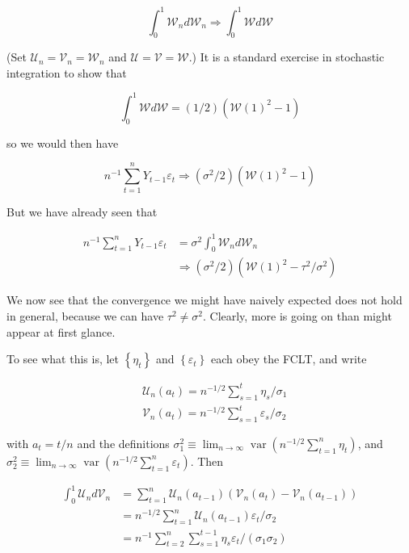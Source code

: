 \documentclass[10pt]{article}
\begin{document}
$$
\int_{0}^{1} \mathcal{W}_{n} d \mathcal{W}_{n} \Rightarrow \int_{0}^{1} \mathcal{W} d \mathcal{W}
$$

(Set $\mathcal{U}_{n}=\mathcal{V}_{n}=\mathcal{W}_{n}$ and $\mathcal{U}=\mathcal{V}=\mathcal{W}$.) It is a standard exercise in stochastic integration to show that

$$
\int_{0}^{1} \mathcal{W} d \mathcal{W}=(1 / 2)\left(\mathcal{W}(1)^{2}-1\right)
$$

so we would then have

$$
n^{-1} \sum_{t=1}^{n} Y_{t-1} \varepsilon_{t} \Rightarrow\left(\sigma^{2} / 2\right)\left(\mathcal{W}(1)^{2}-1\right)
$$

But we have already seen that

$$
\begin{aligned}
n^{-1} \sum_{t=1}^{n} Y_{t-1} \varepsilon_{t} & =\sigma^{2} \int_{0}^{1} \mathcal{W}_{n} d \mathcal{W}_{n} \\
& \Rightarrow\left(\sigma^{2} / 2\right)\left(\mathcal{W}(1)^{2}-\tau^{2} / \sigma^{2}\right)
\end{aligned}
$$

We now see that the convergence we might have naively expected does not hold in general, because we can have $\tau^{2} \neq \sigma^{2}$. Clearly, more is going on than might appear at first glance.

To see what this is, let $\left\{\eta_{t}\right\}$ and $\left\{\varepsilon_{t}\right\}$ each obey the FCLT, and write

$$
\begin{aligned}
& \mathcal{U}_{n}\left(a_{t}\right)=n^{-1 / 2} \sum_{s=1}^{t} \eta_{s} / \sigma_{1} \\
& \mathcal{V}_{n}\left(a_{t}\right)=n^{-1 / 2} \sum_{s=1}^{t} \varepsilon_{s} / \sigma_{2}
\end{aligned}
$$

with $a_{t}=t / n$ and the definitions $\sigma_{1}^{2} \equiv \lim _{n \rightarrow \infty} \operatorname{var}\left(n^{-1 / 2} \sum_{t=1}^{n} \eta_{t}\right)$, and $\sigma_{2}^{2} \equiv \lim _{n \rightarrow \infty} \operatorname{var}\left(n^{-1 / 2} \sum_{t=1}^{n} \varepsilon_{t}\right)$. Then

$$
\begin{aligned}
\int_{0}^{1} \mathcal{U}_{n} d \mathcal{V}_{n} & =\sum_{t=1}^{n} \mathcal{U}_{n}\left(a_{t-1}\right)\left(\mathcal{V}_{n}\left(a_{t}\right)-\mathcal{V}_{n}\left(a_{t-1}\right)\right) \\
& =n^{-1 / 2} \sum_{t=1}^{n} \mathcal{U}_{n}\left(a_{t-1}\right) \varepsilon_{t} / \sigma_{2} \\
& =n^{-1} \sum_{t=2}^{n} \sum_{s=1}^{t-1} \eta_{s} \varepsilon_{t} /\left(\sigma_{1} \sigma_{2}\right)
\end{aligned}
$$
\end{document}
